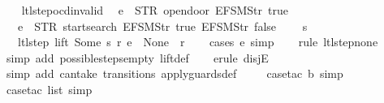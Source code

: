 \begin{isabellebody}
\ \ \isamarkupfalse%
%
\endisatagproof
{\isafoldproof}%
%
\isadelimproof
\isanewline
%
\endisadelimproof
\isanewline
{}\isamarkupfalse%
\ ltl{\isacharunderscore}step{\isacharunderscore}ocd{\isacharunderscore}invalid{\isacharcolon}\isanewline
\ \ {\isachardoublequoteopen}e\ {\isasymnoteq}\ {\isacharparenleft}STR\ {\isacharprime}{\isacharprime}opendoor{\isacharprime}{\isacharprime}{\isacharcomma}\ {\isacharbrackleft}EFSM{\isachardot}Str\ {\isacharprime}{\isacharprime}true{\isacharprime}{\isacharprime}{\isacharbrackright}{\isacharparenright}\ {\isasymLongrightarrow}\isanewline
\ \ \ e\ {\isasymnoteq}\ {\isacharparenleft}STR\ {\isacharprime}{\isacharprime}startsearch{\isacharprime}{\isacharprime}{\isacharcomma}\ {\isacharbrackleft}EFSM{\isachardot}Str\ {\isacharprime}{\isacharprime}true{\isacharprime}{\isacharprime}{\isacharcomma}\ EFSM{\isachardot}Str\ {\isacharprime}{\isacharprime}false{\isacharprime}{\isacharprime}{\isacharbrackright}{\isacharparenright}\ {\isasymLongrightarrow}\isanewline
\ \ \ s\ {\isasymin}\ {\isacharbraceleft}{}{\isacharcomma}\ {}{\isacharcomma}\ {}{\isacharcomma}\ {}{\isacharbraceright}\ {\isasymLongrightarrow}\isanewline
\ \ \ ltl{\isacharunderscore}step\ lift\ {\isacharparenleft}Some\ s{\isacharparenright}\ r\ e\ {\isacharequal}\ {\isacharparenleft}None{\isacharcomma}\ {\isacharbrackleft}{\isacharbrackright}{\isacharcomma}\ r{\isacharparenright}{\isachardoublequoteclose}\isanewline
%
\isadelimproof
\ \ %
\endisadelimproof
%
\isatagproof
{}\isamarkupfalse%
\ {\isacharparenleft}cases\ e{\isacharcomma}\ simp{\isacharparenright}\isanewline
\ \ \isamarkupfalse%
\ {\isacharparenleft}rule\ ltl{\isacharunderscore}step{\isacharunderscore}none{\isacharparenright}\isanewline
\ \ \isamarkupfalse%
\ {\isacharparenleft}simp\ add{\isacharcolon}\ possible{\isacharunderscore}steps{\isacharunderscore}empty\ lift{\isacharunderscore}def{\isacharparenright}\isanewline
\ \ \isamarkupfalse%
\ {\isacharparenleft}erule\ disjE{\isacharparenright}\isanewline
\ \ \ \isamarkupfalse%
\ {\isacharparenleft}simp\ add{\isacharcolon}\ can{\isacharunderscore}take\ transitions\ apply{\isacharunderscore}guards{\isacharunderscore}def{\isacharparenright}\isanewline
\ \ \ \isamarkupfalse%
\ {\isacharparenleft}case{\isacharunderscore}tac\ b{\isacharcomma}\ simp{\isacharparenright}\isanewline
\ \ \ \isamarkupfalse%
\ {\isacharparenleft}case{\isacharunderscore}tac\ list{\isacharcomma}\ simp{\isacharparenright}\isanewline

\end{isabellebody}
